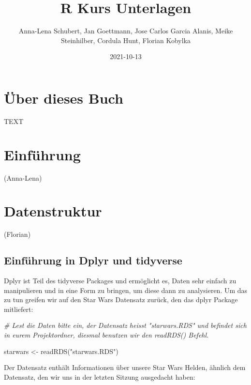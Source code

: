 \documentclass[
]{book}
\title{R Kurs Unterlagen}
\author{Anna-Lena Schubert,
Jan Goettmann,
Jose Carlos Garcia Alanis,
Meike Steinhilber,
Cordula Hunt,
Florian Kobylka}
\date{2021-10-13}
\newenvironment{Shaded}{\begin{snugshade}}{\end{snugshade}}
\newcommand{\CommentTok}[1]{\textcolor[rgb]{0.56,0.35,0.01}{\textit{#1}}}
\newcommand{\FunctionTok}[1]{\textcolor[rgb]{0.00,0.00,0.00}{#1}}
\newcommand{\NormalTok}[1]{#1}
\newcommand{\OtherTok}[1]{\textcolor[rgb]{0.56,0.35,0.01}{#1}}
\newcommand{\StringTok}[1]{\textcolor[rgb]{0.31,0.60,0.02}{#1}}
\theoremstyle{definition}
\theoremstyle{definition}
\theoremstyle{definition}
\theoremstyle{definition}
\theoremstyle{remark}
\begin{document}
\maketitle

{
\setcounter{tocdepth}{1}
\tableofcontents
}
\hypertarget{uxfcber-dieses-buch}{%
\chapter{Über dieses Buch}\label{uxfcber-dieses-buch}}

TEXT

\hypertarget{einfuxfchrung}{%
\chapter{Einführung}\label{einfuxfchrung}}

(Anna-Lena)

\hypertarget{datenstruktur}{%
\chapter{Datenstruktur}\label{datenstruktur}}

(Florian)

\hypertarget{einfuxfchrung-in-dplyr-und-tidyverse}{%
\section{Einführung in Dplyr und tidyverse}\label{einfuxfchrung-in-dplyr-und-tidyverse}}

Dplyr ist Teil des tidyverse Packages und ermöglicht es, Daten sehr einfach zu manipulieren und in eine Form zu bringen, um diese dann zu analysieren. Um das zu tun greifen wir auf den Star Wars Datensatz zurück, den das dplyr Package mitliefert:

\begin{Shaded}
\begin{Highlighting}[]
\CommentTok{\# Lest die Daten bitte ein, der Datensatz heisst "starwars.RDS" und befindet sich in eurem Projektordner, diesmal benutzen wir den readRDS() Befehl.}

\NormalTok{starwars }\OtherTok{\textless{}{-}} \FunctionTok{readRDS}\NormalTok{(}\StringTok{"starwars.RDS"}\NormalTok{)}
\end{Highlighting}
\end{Shaded}

Der Datensatz enthält Informationen über unsere Star Wars Helden, ähnlich dem Datensatz, den wir uns in der letzten Sitzung ausgedacht haben:
\end{document}
